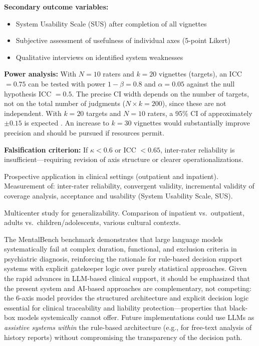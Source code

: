 \documentclass[11pt,a4paper]{article}
\begin{document}
\begin{description}[style=nextline, leftmargin=1.5cm, font=\bfseries]
\textbf{Secondary outcome variables:}
\begin{itemize}[leftmargin=*, noitemsep]
    \item System Usability Scale (SUS) after completion of all vignettes
    \item Subjective assessment of usefulness of individual axes (5-point Likert)
    \item Qualitative interviews on identified system weaknesses
\end{itemize}

\textbf{Power analysis:} With $N = 10$ raters and $k = 20$ vignettes (targets), an ICC $= 0.75$ can be tested with power $1 - \beta = 0.8$ and $\alpha = 0.05$ against the null hypothesis ICC $= 0.5$. The precise CI width depends on the number of targets, not on the total number of judgments ($N \times k = 200$), since these are not independent. With $k = 20$ targets and $N = 10$ raters, a 95\% CI of approximately $\pm 0.15$ is expected \citep{Shrout1979}. An increase to $k = 30$ vignettes would substantially improve precision and should be pursued if resources permit.

\textbf{Falsification criterion:} If $\kappa < 0.6$ or ICC $< 0.65$, inter-rater reliability is insufficient---requiring revision of axis structure or clearer operationalizations.

\item[Phase~3: Clinical Field Trial (N=200+)] Prospective application in clinical settings (outpatient and inpatient). Measurement of: inter-rater reliability, convergent validity, incremental validity of coverage analysis, acceptance and usability (System Usability Scale, SUS).
\item[Phase~4: Multi-Site Trial] Multicenter study for generalizability. Comparison of inpatient vs.\ outpatient, adults vs.\ children/adolescents, various cultural contexts.
\end{description}

The MentalBench benchmark \citep{MentalBench2024} demonstrates that large language models systematically fail at complex duration, functional, and exclusion criteria in psychiatric diagnosis, reinforcing the rationale for rule-based decision support systems with explicit gatekeeper logic over purely statistical approaches. Given the rapid advances in LLM-based clinical support, it should be emphasized that the present system and AI-based approaches are complementary, not competing: the 6-axis model provides the structured architecture and explicit decision logic essential for clinical traceability and liability protection---properties that black-box models systemically cannot offer. Future implementations could use LLMs as \textit{assistive systems within} the rule-based architecture (e.g., for free-text analysis of history reports) without compromising the transparency of the decision path.
\end{document}
